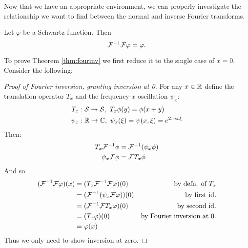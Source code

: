     Now that we have an appropriate environment, we can properly investigate the relationship we want to find between the normal and inverse Fourier transforms.
    \begin{thm}
      \label{thm:fourinv}
      Let $\varphi$ be a Schwartz function.
      Then \[\mathcal{F}^{-1}\mathcal{F} \varphi = \varphi\text{.}\]
    \end{thm}
    To prove Theorem \ref{thm:fourinv} we first reduce it to the single case of $x=0$.
    Consider the following:
    \begin{proof}[Proof of Fourier inversion, granting inversion at 0]
      For any $x\in\mathbb{R}$ define the translation operator $T_x$ and the frequency-$x$ oscillation $\psi_x$:
      \begin{align*}
        T_x&:\mathcal{S}\rightarrow\mathcal{S},\ T_x\phi(y) = \phi(x+y)\\
        \psi_x&:\mathbb{R}\rightarrow\mathbb{C},\ \psi_x(\xi) = \psi(x,\xi) = e^{2\pi i x \xi}
      \end{align*}
      Then: 
      \begin{align*}
        T_x\mathcal{F}^{-1}\phi &= \mathcal{F}^{-1}(\psi_x\phi)\\
        \psi_x\mathcal{F}\phi &= \mathcal{F} T_x\phi
      \end{align*}
      And so
      \begin{align*}
        (\mathcal{F}^{-1}\mathcal{F}\varphi)(x) &= (T_x\mathcal{F}^{-1}\mathcal{F}\varphi)(0) &\text{by defn. of $T_x$}\\
        &= (\mathcal{F}^{-1}(\psi_x\mathcal{F}\varphi))(0) &\text{by first id.}\\
        &= (\mathcal{F}^{-1}\mathcal{F} T_x\varphi)(0)  &\text{by second id.}\\
        &= (T_x\varphi)(0) &\text{by Fourier inversion at 0.}\\
        &= \varphi(x)&\qedhere
      \end{align*}
    Thus we only need to show inversion at zero.
    \end{proof}

